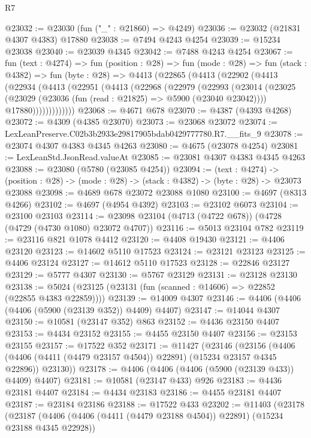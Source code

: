 \begin{lexlean}{R7}
\begin{coremodule}
@23032 := @23030 (fun ("_" : @21860) => @4249)
@23036 := @23032 (@21831 @4307 @4383) @17880
@23038 := @7494 @4243 @4254
@23039 := @15234 @23038
@23040 := @23039 @4345
@23042 := @7488 @4243 @4254
@23067 := fun (text : @4274) =>
  fun (position : @28) =>
  fun (mode : @28) =>
  fun (stack : @4382) =>
  fun (byte : @28) =>
  @4413
    (@22865
      (@4413
        (@22902
          (@4413
            (@22934
              (@4413
                (@22951
                  (@4413
                    (@22968
                      (@22979
                        (@22993
                          (@23014
                            (@23025
                              (@23029 (@23036 (fun (read : @21825) => @5900 (@23040 @23042))))
                              @17880)))))))))))))
@23068 := @4671 @678
@23070 := @4387 (@4393 @4268)
@23072 := @4309 (@4385 @23070)
@23073 := @23068 @23072
@23074 := LexLeanPreserve.C02b3b2933e29817905bdab0429777780.R7.__fits_9
@23078 := @23074 @4307 @4383 @4345 @4263
@23080 := @4675 (@23078 @4254)
@23081 := LexLeanStd.JsonRead.valueAt
@23085 := @23081 @4307 @4383 @4345 @4263
@23088 := @23080 (@5780 (@23085 @4254))
@23094 := (text : @4274) ->
  (position : @28) -> (mode : @28) -> (stack : @4382) -> (byte : @28) -> @23073 @23088
@23098 := @4689 @678 @23072 @23088 @1080
@23100 := @4697 (@8313 @4266)
@23102 := @4697 (@4954 @4392)
@23103 := @23102 @6073
@23104 := @23100 @23103
@23114 := @23098 @23104 (@4713 (@4722 @678)) (@4728 (@4729 (@4730 @1080) @23072 @4707))
@23116 := @5013 @23104 @782
@23119 := @23116 @821 @1078 @4412
@23120 := @4408 @19430
@23121 := @4406 @23120
@23123 := @14602 @5110 @17523
@23124 := @23121 @23123
@23125 := @4406 @23124
@23127 := @14612 @5110 @17523
@23128 := @22846 @23127
@23129 := @5777 @4307
@23130 := @5767 @23129
@23131 := @23128 @23130
@23138 := @5024 (@23125 (@23131 (fun (scanned : @14606) => @22852 (@22855 @4383 @22859))))
@23139 := @14009 @4307
@23146 := @4406 (@4406 (@4406 (@5900 (@23139 @352)) @4409) @4407)
@23147 := @14044 @4307
@23150 := @10581 (@23147 @352) @863
@23152 := @4436 @23150 @4407
@23153 := @4434 @23152
@23155 := @4455 @23150 @4407
@23156 := @23153 @23155
@23157 := @17522 @352
@23171 := @11427
    (@23146
      (@23156
        (@4406 (@4406 (@4411 (@4479 @23157 @4504)) @22891) (@15234 @23157 @4345 @22896))
        @23130))
@23178 := @4406 (@4406 (@4406 (@5900 (@23139 @433)) @4409) @4407)
@23181 := @10581 (@23147 @433) @926
@23183 := @4436 @23181 @4407
@23184 := @4434 @23183
@23186 := @4455 @23181 @4407
@23187 := @23184 @23186
@23188 := @17522 @433
@23202 := @11403
    (@23178
      (@23187
        (@4406 (@4406 (@4411 (@4479 @23188 @4504)) @22891) (@15234 @23188 @4345 @22928))

\end{coremodule}
\end{lexlean}
